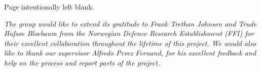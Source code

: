 \vspace*{\fill}
\begin{center}
Page intentionally left blank.
\end{center}
\vspace*{\fill}

\pagebreak

\vspace*{7cm}
\begin{center}

\emph{The group would like to extend its gratitude to Frank Trethan Johnsen and Trude Hafsøe Bloebaum from the Norwegian Defence Research Establishment (FFI) for their excellent collaboration throughout the lifetime of this project. We would also like to thank our supervisor Alfredo Perez Fernand, for his excellent feedback and help on the process and report parts of the project.}

\end{center}